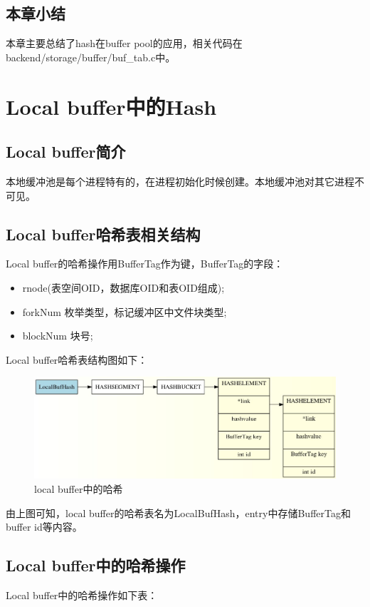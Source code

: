 \documentclass{article}
\begin{document}
\begin{CJK*}{UTF8}{gkai}
\subsection{本章小结}
\indent 本章主要总结了hash在buffer pool的应用，相关代码在 backend/storage/buffer/buf\_tab.c中。


\section{Local buffer中的Hash} 
\subsection{Local buffer简介}
\indent 本地缓冲池是每个进程特有的，在进程初始化时候创建。本地缓冲池对其它进程不可见。

\subsection{Local buffer哈希表相关结构}
\indent Local buffer的哈希操作用BufferTag作为键，BufferTag的字段：

\begin{itemize}
\item \quad rnode(表空间OID，数据库OID和表OID组成);\\
\item \quad forkNum 枚举类型，标记缓冲区中文件块类型;\\
\item \quad blockNum  块号;
\end{itemize}

\indent Local buffer哈希表结构图如下：

\begin{figure}[H] 
\centering
\includegraphics[width = \textwidth]{local.jpg}
\caption{local buffer中的哈希}
\label{overflow}
\end{figure}

\indent 由上图可知，local buffer的哈希表名为LocalBufHash，entry中存储BufferTag和buffer id等内容。

\subsection{Local buffer中的哈希操作}
\indent Local buffer中的哈希操作如下表：
\begin{table}[H] 
\scriptsize


\end{table}
\end{CJK*}
\end{document}
